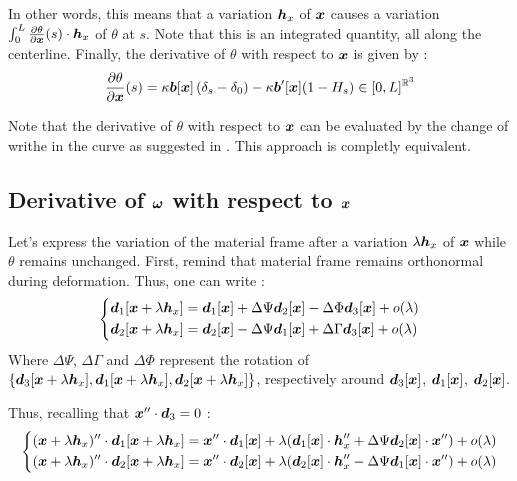 In other words, this means that a variation $\boldsymbol{h}_x$ of $\boldsymbol{x}$ causes a variation $\int_0^L \frac{\partial\theta}{\partial\boldsymbol{x}}(s) \cdot  \boldsymbol{h}_x$ of $\theta$ at $s$. Note that this is an integrated quantity, all along the centerline. Finally, the derivative of $\theta$ with respect to $\boldsymbol{x}$ is given by :
\begin{equation}
	\frac{\partial\theta}{\partial\boldsymbol{x}}(s) = \kappa\boldsymbol{b}[\boldsymbol{x}]\left(\delta_s-\delta_0\right) - \kappa\boldsymbol{b}'[\boldsymbol{x}](1-H_s) \in [0,L]^{\mathbb{R}^3}
\end{equation}

Note that the derivative of $\theta$ with respect to $\boldsymbol{x}$ can be evaluated by the change of writhe in the curve as suggested in \cite{deVries2005}. This approach is completly equivalent.

\subsection{Derivative of $\boldsymbol{\omega}$ with respect to $\boldsymbol{x}$}

Let’s express the variation of the material frame after a variation $\lambda \boldsymbol{h}_x$ of $\boldsymbol{x}$ while $\theta$ remains unchanged. First, remind that material frame remains orthonormal during deformation. Thus, one can write :
\begin{equation}
	\left\{
		\begin{aligned}
			&\boldsymbol{d}_1[\boldsymbol{x}+\lambda \boldsymbol{h}_x] = \boldsymbol{d}_1[\boldsymbol{x}] + \Delta \Psi \boldsymbol{d}_2[\boldsymbol{x}] - \Delta \Phi \boldsymbol{d}_3[\boldsymbol{x}] + o(\lambda)\\
			&\boldsymbol{d}_2[\boldsymbol{x}+\lambda \boldsymbol{h}_x] = \boldsymbol{d}_2[\boldsymbol{x}] - \Delta \Psi \boldsymbol{d}_1[\boldsymbol{x}] + \Delta\Gamma \boldsymbol{d}_3[\boldsymbol{x}] + o(\lambda)
		\end{aligned}
	\right.
\end{equation}
Where $\Delta\Psi$, $\Delta\Gamma$ and $\Delta\Phi$ represent the rotation of $\{\boldsymbol{d}_3[\boldsymbol{x}+\lambda \boldsymbol{h}_x],\boldsymbol{d}_1[\boldsymbol{x}+\lambda \boldsymbol{h}_x],\boldsymbol{d}_2[\boldsymbol{x}+\lambda \boldsymbol{h}_x]\}$, respectively around $\boldsymbol{d}_3[\boldsymbol{x}]$, $\boldsymbol{d}_1[\boldsymbol{x}]$, $\boldsymbol{d}_2[\boldsymbol{x}]$.

Thus, recalling that $\boldsymbol{x}''\cdot\boldsymbol{d}_3 = 0$ :
\begin{equation}
	\left\{
		\begin{aligned}
			(\boldsymbol{x}+\lambda \boldsymbol{h}_x)'' \cdot \boldsymbol{d}_1[\boldsymbol{x}+\lambda \boldsymbol{h}_x] = 
			\boldsymbol{x}''\cdot\boldsymbol{d}_1[\boldsymbol{x}] + \lambda(\boldsymbol{d}_1[\boldsymbol{x}]\cdot\boldsymbol{h}''_x + \Delta\Psi \boldsymbol{d}_2[\boldsymbol{x}]\cdot\boldsymbol{x}'') + o(\lambda) \\
			(\boldsymbol{x}+\lambda \boldsymbol{h}_x)'' \cdot \boldsymbol{d}_2[\boldsymbol{x}+\lambda \boldsymbol{h}_x] =
			\boldsymbol{x}''\cdot\boldsymbol{d}_2[\boldsymbol{x}] + \lambda(\boldsymbol{d}_2[\boldsymbol{x}]\cdot\boldsymbol{h}''_x - \Delta\Psi \boldsymbol{d}_1[\boldsymbol{x}]\cdot\boldsymbol{x}'') + o(\lambda)
		\end{aligned}
		\right.
\end{equation}


